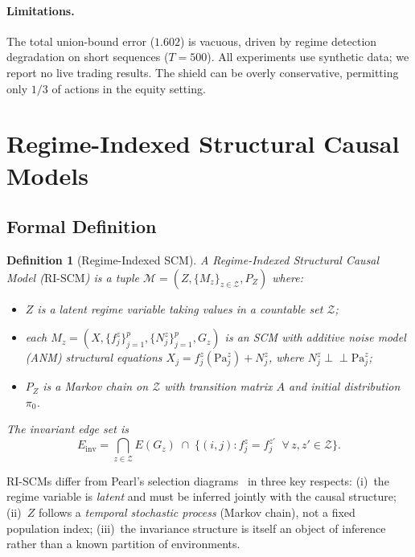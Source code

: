 \documentclass[11pt]{article}
\newtheorem{definition}[theorem]{Definition}
\newcommand{\RISCM}{\text{RI-SCM}}
\newcommand{\cM}{\mathcal{M}}
\newcommand{\cZ}{\mathcal{Z}}
\begin{document}
\paragraph{Limitations.}
The total union-bound error ($1.602$) is vacuous, driven by regime
detection degradation on short sequences ($T{=}500$).  All
experiments use synthetic data; we report no live trading results.
The shield can be overly conservative, permitting only $1/3$ of
actions in the equity setting.


\section{Regime-Indexed Structural Causal Models}\label{sec:riscm}

\subsection{Formal Definition}

\begin{definition}[Regime-Indexed SCM]\label{def:riscm}
A \emph{Regime-Indexed Structural Causal Model} ($\RISCM$) is a tuple
$\cM = (Z, \{M_z\}_{z \in \cZ}, P_Z)$ where:
\begin{itemize}[nosep]
  \item $Z$ is a latent regime variable taking values in a countable
        set $\cZ$;
  \item each $M_z = (X, \{f^z_j\}_{j=1}^p, \{N^z_j\}_{j=1}^p, G_z)$
        is an SCM with additive noise model (ANM) structural equations
        $X_j = f^z_j(\mathrm{Pa}_j^z) + N^z_j$, where
        $N^z_j \perp\!\!\!\perp \mathrm{Pa}_j^z$;
  \item $P_Z$ is a Markov chain on $\cZ$ with transition matrix $A$
        and initial distribution $\pi_0$.
\end{itemize}
The \emph{invariant edge set} is
\begin{equation}
  E_{\mathrm{inv}} = \bigcap_{z \in \cZ} E(G_z) \;\cap\;
  \bigl\{(i,j) : f^z_j = f^{z'}_j \;\;\forall\, z, z' \in \cZ\bigr\}.
\end{equation}
\end{definition}

RI-SCMs differ from Pearl's selection
diagrams~\cite{bareinboim2016causal} in three key respects:
(i)~the regime variable is \emph{latent} and must be inferred jointly
with the causal structure; (ii)~$Z$ follows a \emph{temporal stochastic
process} (Markov chain), not a fixed population index; (iii)~the
invariance structure is itself an object of inference rather than a
known partition of environments.
\end{document}
